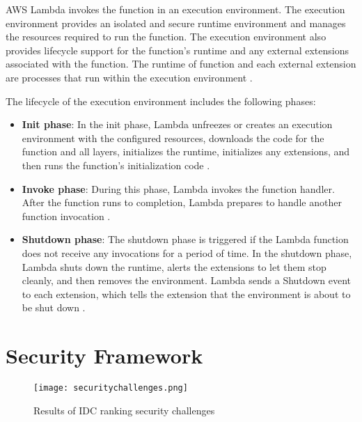 {\par AWS Lambda invokes the function in an execution environment. The execution environment provides an isolated and secure runtime environment and manages the resources required to run the function. The execution environment also provides lifecycle support for the function's runtime and any external extensions associated with the function. The runtime of function and each external extension are processes that run within the execution environment \cite{27}.

\par The lifecycle of the execution environment includes the following phases:
\begin{itemize}
    \item \textbf{Init phase}: In the init phase, Lambda unfreezes or creates an execution environment with the configured
    resources, downloads the code for the function and all layers, initializes the runtime, initializes any
    extensions, and then runs the function’s initialization code \cite{27}.
\end{itemize}
\begin{itemize}
    \item \textbf{Invoke phase}: During this phase, Lambda invokes the function handler. After the function runs to
    completion, Lambda prepares to handle another function invocation \cite{27}.
\end{itemize}
\begin{itemize}
    \item \textbf{Shutdown phase}: The shutdown phase is triggered if the Lambda function does not receive any invocations
    for a period of time. In the shutdown phase, Lambda shuts down the runtime, alerts the extensions to let them
    stop cleanly, and then removes the environment. Lambda sends a Shutdown event to each extension, which tells the extension that the environment is about to be shut down \cite{27}.
\end{itemize}


\section{Security Framework}

\begin{figure}
    \centering
    \texttt{[image: securitychallenges.png]}
    \caption{Results of IDC ranking security challenges}
    \label{fig:securitychallenges}
\end{figure}

}
